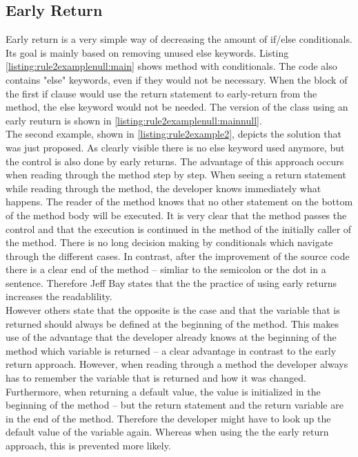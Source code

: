 \subsection*{Early Return}
Early return is a very simple way of decreasing the amount of if/else conditionals. Its goal is mainly based on removing unused else keywords. Listing \ref{listing:rule2examplenull:main} shows method with conditionals. The code also contains "else" keywords, even if they would not be necessary. When the block of the first if clause would use the return statement to early-return from the method, the else keyword would not be needed. The version of the class using an early reuturn is shown in \ref{listing:rule2examplenull:mainnull}.
\\

The second example, shown in \ref{listing:rule2example2}, depicts the solution that was just proposed. As clearly visible there is no else keyword used anymore, but the control is also done by early returns. The advantage of this approach occurs when reading through the method step by step. When seeing a return statement while reading through the method, the developer knows immediately what happens. The reader of the method knows that no other statement on the bottom of the method body will be executed. It is very clear that the method passes the control and that the execution is continued in the method of the initially caller of the method. There is no long decision making by conditionals which navigate through the different cases. In contrast, after the improvement of the source code there is a clear end of the method -- simliar to the semicolon or the dot in a sentence. Therefore Jeff Bay states that the the practice of using early returns increases the  readablility. 
\\

However others state that the opposite is the case and that the variable that is returned should always be defined at the beginning of the method. This makes use of the advantage that the developer already knows at the beginning of the method which variable is returned -- a clear advantage in contrast to the early return approach. However, when reading through a method the developer always has to remember the variable that is returned and how it was changed. Furthermore, when returning a default value, the value is initialized in the beginning of the method -- but the return statement and the return variable are in the end of the method. Therefore the developer might have to look up the default value of the variable again. Whereas when using the the early return approach, this is prevented more likely.

